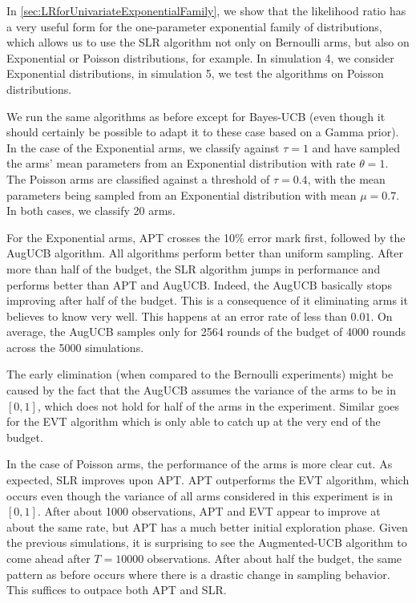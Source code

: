 \documentclass[11pt,]{article}
\begin{document}
In \autoref{sec:LRforUnivariateExponentialFamily}, we show that the
likelihood ratio has a very useful form for the one-parameter
exponential family of distributions, which allows us to use the SLR
algorithm not only on Bernoulli arms, but also on Exponential or Poisson
distributions, for example. In simulation 4, we consider Exponential
distributions, in simulation 5, we test the algorithms on Poisson
distributions.

We run the same algorithms as before except for Bayes-UCB (even though
it should certainly be possible to adapt it to these case based on a
Gamma prior). In the case of the Exponential arms, we classify against
\(\tau = 1\) and have sampled the arms' mean parameters from an
Exponential distribution with rate \(\theta = 1\). The Poisson arms are
classified against a threshold of \(\tau = 0.4\), with the mean
parameters being sampled from an Exponential distribution with mean
\(\mu = 0.7\). In both cases, we classify 20 arms.

For the Exponential arms, APT crosses the 10\% error mark first,
followed by the AugUCB algorithm. All algorithms perform better than
uniform sampling. After more than half of the budget, the SLR algorithm
jumps in performance and performs better than APT and AugUCB. Indeed,
the AugUCB basically stops improving after half of the budget. This is a
consequence of it eliminating arms it believes to know very well. This
happens at an error rate of less than \(0.01\). On average, the AugUCB
samples only for 2564 rounds of the budget of 4000 rounds across the
5000 simulations.

The early elimination (when compared to the Bernoulli experiments) might
be caused by the fact that the AugUCB assumes the variance of the arms
to be in \([0,1]\), which does not hold for half of the arms in the
experiment. Similar goes for the EVT algorithm which is only able to
catch up at the very end of the budget.

In the case of Poisson arms, the performance of the arms is more clear
cut. As expected, SLR improves upon APT. APT outperforms the EVT
algorithm, which occurs even though the variance of all arms considered
in this experiment is in \([0,1]\). After about 1000 observations, APT
and EVT appear to improve at about the same rate, but APT has a much
better initial exploration phase. Given the previous simulations, it is
surprising to see the Augmented-UCB algorithm to come ahead after
\(T=10000\) observations. After about half the budget, the same pattern
as before occurs where there is a drastic change in sampling behavior.
This suffices to outpace both APT and SLR.
\end{document}
